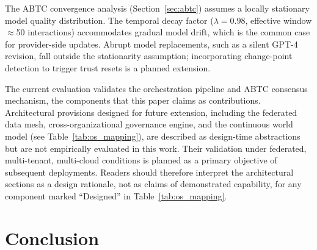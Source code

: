 \documentclass{iopjournal}
\begin{document}
The ABTC convergence analysis (Section~\ref{sec:abtc}) assumes a locally stationary model quality distribution. The temporal decay factor ($\lambda = 0.98$, effective window $\approx$50 interactions) accommodates gradual model drift, which is the common case for provider-side updates. Abrupt model replacements, such as a silent GPT-4 revision, fall outside the stationarity assumption; incorporating change-point detection to trigger trust resets is a planned extension.

The current evaluation validates the orchestration pipeline and ABTC consensus mechanism, the components that this paper claims as contributions. Architectural provisions designed for future extension, including the federated data mesh, cross-organizational governance engine, and the continuous world model (see Table~\ref{tab:os_mapping}), are described as design-time abstractions but are not empirically evaluated in this work. Their validation under federated, multi-tenant, multi-cloud conditions is planned as a primary objective of subsequent deployments. Readers should therefore interpret the architectural sections as a design rationale, not as claims of demonstrated capability, for any component marked ``Designed'' in Table~\ref{tab:os_mapping}.

\section{Conclusion}
\label{sec:conclusion}
\end{document}
